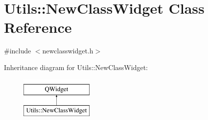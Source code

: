 \hypertarget{class_utils_1_1_new_class_widget}{\section{Utils\-:\-:New\-Class\-Widget Class Reference}
\label{class_utils_1_1_new_class_widget}
}


{\ttfamily \#include $<$newclasswidget.\-h$>$}

Inheritance diagram for Utils\-:\-:New\-Class\-Widget\-:\begin{figure}[H]
\begin{center}
\leavevmode
\includegraphics[height=2.000000cm]{class_utils_1_1_new_class_widget}
\end{center}
\end{figure}
